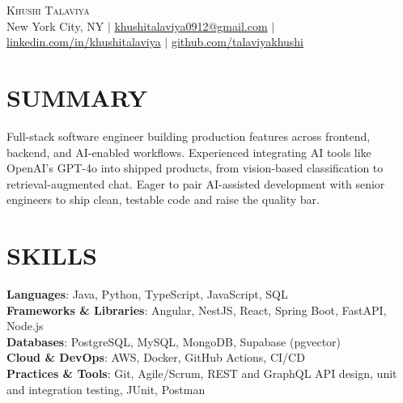 \documentclass[letterpaper,11pt]{article}
\begin{document}
\begin{center}
    {\Huge \scshape Khushi Talaviya} \\ \vspace{2pt}
    \vspace{4pt}
    \small
    New York City, NY $|$
    \href{mailto:khushitalaviya0912@gmail.com}{khushitalaviya0912@gmail.com} $|$
    \href{https://www.linkedin.com/in/khushitalaviya/}{linkedin.com/in/khushitalaviya} $|$
    \href{https://github.com/talaviyakhushi}{github.com/talaviyakhushi}
\end{center}

\section{SUMMARY}
\vspace{5pt}
\small{Full-stack software engineer building production features across frontend, backend, and AI-enabled workflows. Experienced integrating AI tools like OpenAI's GPT-4o into shipped products, from vision-based classification to retrieval-augmented chat. Eager to pair AI-assisted development with senior engineers to ship clean, testable code and raise the quality bar.}

\vspace{2pt}
\section{SKILLS}
\vspace{5pt}
\begin{itemize}[leftmargin=0in, label={}]
\small{\item{
\textbf{Languages}{: Java, Python, TypeScript, JavaScript, SQL} \\
\textbf{Frameworks \& Libraries}{: Angular, NestJS, React, Spring Boot, FastAPI, Node.js} \\
\textbf{Databases}{: PostgreSQL, MySQL, MongoDB, Supabase (pgvector)} \\
\textbf{Cloud \& DevOps}{: AWS, Docker, GitHub Actions, CI/CD} \\
\textbf{Practices \& Tools}{: Git, Agile/Scrum, REST and GraphQL API design, unit and integration testing, JUnit, Postman}
}}
\end{itemize}
\vspace{-10pt}

\end{document}
